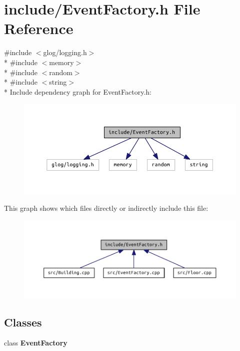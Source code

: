 \section{include/\+Event\+Factory.h File Reference}
\label{_event_factory_8h}
{\ttfamily \#include $<$glog/logging.\+h$>$}\\*
{\ttfamily \#include $<$memory$>$}\\*
{\ttfamily \#include $<$random$>$}\\*
{\ttfamily \#include $<$string$>$}\\*
Include dependency graph for Event\+Factory.\+h\+:
\nopagebreak
\begin{figure}[H]
\begin{center}
\leavevmode
\includegraphics[width=318pt]{_event_factory_8h__incl}
\end{center}
\end{figure}
This graph shows which files directly or indirectly include this file\+:
\nopagebreak
\begin{figure}[H]
\begin{center}
\leavevmode
\includegraphics[width=350pt]{_event_factory_8h__dep__incl}
\end{center}
\end{figure}
\subsection*{Classes}
\begin{DoxyCompactItemize}
\item 
class {\bf Event\+Factory}
\end{DoxyCompactItemize}
